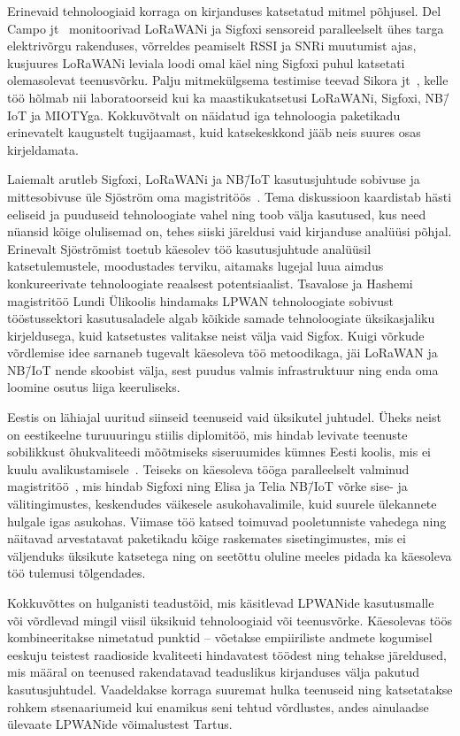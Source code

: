 \documentclass[12pt]{article}
\begin{document}
    Erinevaid tehnoloogiaid korraga on kirjanduses katsetatud mitmel põhjusel.
    Del Campo jt~\cite{del2019hybrid} monitoorivad LoRaWANi ja Sigfoxi sensoreid paralleelselt ühes targa elektrivõrgu rakenduses, võrreldes peamiselt RSSI ja SNRi muutumist ajas, kusjuures LoRaWANi leviala loodi omal käel ning Sigfoxi puhul katsetati olemasolevat teenusvõrku.
    Palju mitmekülgsema testimise teevad Sikora jt~\cite{sikora2019test}, kelle töö hõlmab nii laboratoorseid kui ka maastikukatsetusi LoRaWANi, Sigfoxi, NB\=/IoT ja MIOTYga.
    Kokkuvõtvalt on näidatud iga tehnoloogia paketikadu erinevatelt kaugustelt tugijaamast, kuid katsekeskkond jääb neis suures osas kirjeldamata.

    Laiemalt arutleb Sigfoxi, LoRaWANi ja NB\=/IoT kasutusjuhtude sobivuse ja mittesobivuse üle Sjöström oma magistritöös~\cite{sjostrom2017unlicensed}.
    Tema diskussioon kaardistab hästi eeliseid ja puuduseid tehnoloogiate vahel ning toob välja kasutused, kus need nüansid kõige olulisemad on, tehes siiski järeldusi vaid kirjanduse analüüsi põhjal.
    Erinevalt Sjöströmist toetub käesolev töö kasutusjuhtude analüüsil katsetulemustele, moodustades terviku, aitamaks lugejal luua aimdus konkureerivate tehnoloogiate reaalsest potentsiaalist.
    Tsavalose ja Hashemi~\cite{tsavalos2018low} magistritöö Lundi Ülikoolis hindamaks LPWAN tehnoloogiate sobivust tööstussektori kasutusaladele algab kõikide samade tehnoloogiate üksikasjaliku kirjeldusega, kuid katsetustes valitakse neist välja vaid Sigfox.
    Kuigi võrkude võrdlemise idee sarnaneb tugevalt käesoleva töö metoodikaga, jäi LoRaWAN ja NB\=/IoT nende skoobist välja, sest puudus valmis infrastruktuur ning enda oma loomine osutus liiga keeruliseks.

    Eestis on lähiajal uuritud siinseid teenuseid vaid üksikutel juhtudel.
    Üheks neist on eestikeelne turuuuringu stiilis diplomitöö, mis hindab levivate teenuste sobilikkust õhukvaliteedi mõõtmiseks siseruumides kümnes Eesti koolis, mis ei kuulu avalikustamisele~\cite{sild2019}.
    Teiseks on käesoleva tööga paralleelselt valminud magistritöö~\cite{poddar2020}, mis hindab Sigfoxi ning Elisa ja Telia NB\=/IoT võrke sise- ja välitingimustes, keskendudes väikesele asukohavalimile, kuid suurele ülekannete hulgale igas asukohas.
    Viimase töö katsed toimuvad pooletunniste vahedega ning näitavad arvestatavat paketikadu kõige raskemates sisetingimustes, mis ei väljenduks üksikute katsetega ning on seetõttu oluline meeles pidada ka käesoleva töö tulemusi tõlgendades.

    Kokkuvõttes on hulganisti teadustöid, mis käsitlevad LPWANide kasutusmalle või võrdlevad mingil viisil üksikuid tehnoloogiaid või teenusvõrke.
    Käesolevas töös kombineeritakse nimetatud punktid -- võetakse empiiriliste andmete kogumisel eeskuju teistest raadioside kvaliteeti hindavatest töödest ning tehakse järeldused, mis määral on teenused rakendatavad teaduslikus kirjanduses välja pakutud kasutusjuhtudel.
    Vaadeldakse korraga suuremat hulka teenuseid ning katsetatakse rohkem stsenaariumeid kui enamikus seni tehtud võrdlustes, andes ainulaadse ülevaate LPWANide võimalustest Tartus.
\end{document}
